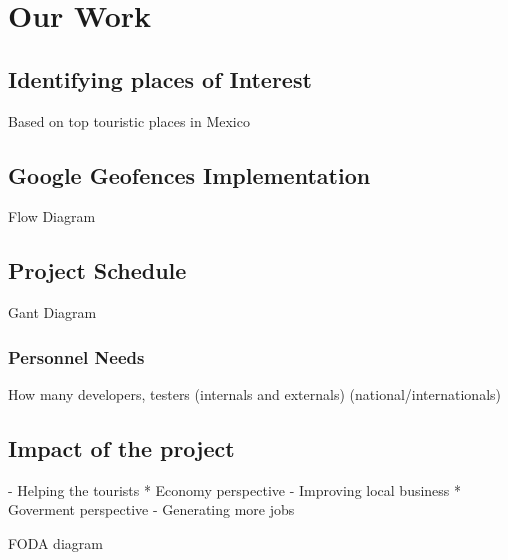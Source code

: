 \section{Our Work}


\subsection{Identifying places of Interest}
Based on top touristic places in Mexico

\subsection{Google Geofences Implementation}
Flow Diagram

\subsection{Project Schedule}
Gant Diagram

\subsubsection{Personnel Needs}
How many developers, testers (internals and externals)
(national/internationals)

\subsection{Impact of the project}
- Helping the tourists
* Economy perspective
- Improving local business 
* Goverment perspective
- Generating more jobs

FODA diagram



